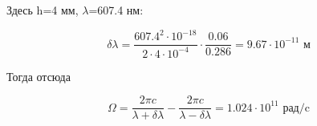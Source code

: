 Здесь h=4 мм,  $\lambda$=607.4 нм:

\begin{equation}
 	\delta \lambda=\frac{607.4^2\cdot10^{-18}}{2\cdot4\cdot10^{-4}}\cdot\frac{0.06}{0.286}=9.67\cdot10^{-11} \text{ м}
 \end{equation} 

Тогда отсюда

\begin{equation}
	\Omega=\frac{2\pi c}{\lambda+\delta \lambda}-\frac{2\pi c}{\lambda-\delta \lambda}=1.024\cdot10^{11} \text{ рад/c}
\end{equation}